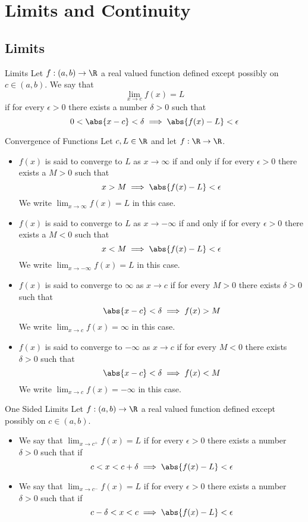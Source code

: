\pagebreak
\section{Limits and Continuity}
\subsection{Limits}
\begin{defn}{Limits}{} Let $f:(a,b)\to\R$ a real valued function defined except possibly on $c\in(a,b)$. We say that $$\lim_{x\to c}f(x)=L$$ if for every $\epsilon>0$ there exists a number $\delta>0$ such that $$0<\abs{x-c}<\delta\implies\abs{f(x)-L}<\epsilon$$
\end{defn}

\begin{defn}{Convergence of Functions}{} Let $c,L\in\R$ and let $f:\R\to\R$. 
\begin{itemize} 
\item $f(x)$ is said to converge to $L$ as $x\to\infty$ if and only if for every $\epsilon>0$ there exists a $M>0$ such that $$x>M\implies\abs{f(x)-L}<\epsilon$$ We write $\lim_{x\to\infty}f(x)=L$ in this case. 
\item $f(x)$ is said to converge to $L$ as $x\to-\infty$ if and only if for every $\epsilon>0$ there exists a $M<0$ such that $$x<M\implies\abs{f(x)-L}<\epsilon$$ We write $\lim_{x\to-\infty}f(x)=L$ in this case. 
\item $f(x)$ is said to converge to $\infty$ as $x\to c$ if for every $M>0$ there exists $\delta>0$ such that $$\abs{x-c}<\delta\implies f(x)>M$$ We write $\lim_{x\to c}f(x)=\infty$ in this case. 
\item $f(x)$ is said to converge to $-\infty$ as $x\to c$ if for every $M<0$ there exists $\delta>0$ such that $$\abs{x-c}<\delta\implies f(x)<M$$ We write $\lim_{x\to c}f(x)=-\infty$ in this case. 
\end{itemize}
\end{defn}

\begin{defn}{One Sided Limits}{} Let $f:(a,b)\to\R$ a real valued function defined except possibly on $c\in(a,b)$. 
\begin{itemize}
\item We say that $\lim_{x\to c^+}f(x)=L$ if for every $\epsilon>0$ there exists a number $\delta>0$ such that if $$c<x<c+\delta\implies\abs{f(x)-L}<\epsilon$$
\item We say that $\lim_{x\to c^-}f(x)=L$ if for every $\epsilon>0$ there exists a number $\delta>0$ such that if $$c-\delta<x<c\implies\abs{f(x)-L}<\epsilon$$
\end{itemize}
\end{defn}

